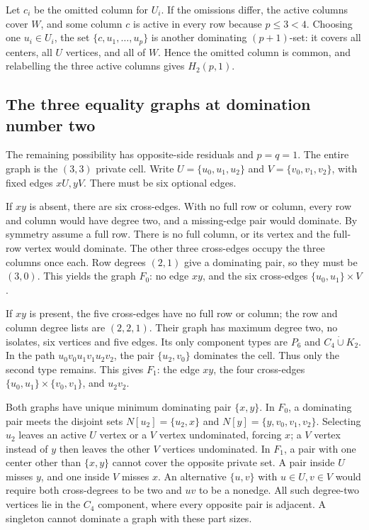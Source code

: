 \documentclass[11pt]{article}
\theoremstyle{definition}
\theoremstyle{remark}
\begin{document}
Let $c_i$ be the omitted column for $U_i$. If the omissions differ,
the active columns cover $W$, and some column $c$ is active in every
row because $p\le3<4$. Choosing one $u_i\in U_i$, the set
$\{c,u_1,\ldots,u_p\}$ is another dominating $(p+1)$-set: it covers all
centers, all $U$ vertices, and all of $W$. Hence the omitted column is
common, and relabelling the three active columns gives $H_2(p,1)$.

\subsection{The three equality graphs at domination number two}

The remaining possibility has opposite-side residuals and $p=q=1$.
The entire graph is the $(3,3)$ private cell. Write
$U=\{u_0,u_1,u_2\}$ and $V=\{v_0,v_1,v_2\}$, with fixed edges $xU,yV$.
There must be six optional edges.

If $xy$ is absent, there are six cross-edges. With no full row or column,
every row and column would have degree two, and a missing-edge pair
would dominate. By symmetry assume a full row. There is no full column,
or its vertex and the full-row vertex would dominate. The other three
cross-edges occupy the three columns once each. Row degrees $(2,1)$
give a dominating pair, so they must be $(3,0)$. This yields the graph
$F_0$: no edge $xy$, and the six cross-edges $\{u_0,u_1\}\times V$.

If $xy$ is present, the five cross-edges have no full row or column;
the row and column degree lists are $(2,2,1)$. Their graph has maximum
degree two, no isolates, six vertices and five edges. Its only component
types are $P_6$ and $C_4\mathbin{\dot\cup}K_2$. In the path
$u_0v_0u_1v_1u_2v_2$, the pair $\{u_2,v_0\}$ dominates the cell.
Thus only the second type remains. This gives $F_1$: the edge $xy$,
the four cross-edges $\{u_0,u_1\}\times\{v_0,v_1\}$, and $u_2v_2$.

Both graphs have unique minimum dominating pair $\{x,y\}$. In $F_0$,
a dominating pair meets the disjoint sets $N[u_2]=\{u_2,x\}$ and
$N[y]=\{y,v_0,v_1,v_2\}$. Selecting $u_2$ leaves an active $U$ vertex
or a $V$ vertex undominated, forcing $x$; a $V$ vertex instead of $y$
then leaves the other $V$ vertices undominated. In $F_1$, a pair with
one center other than $\{x,y\}$ cannot cover the opposite private set.
A pair inside $U$ misses $y$, and one inside $V$ misses $x$.
An alternative $\{u,v\}$ with $u\in U,v\in V$ would require both
cross-degrees to be two and $uv$ to be a nonedge. All such degree-two
vertices lie in the $C_4$ component, where every opposite pair is
adjacent. A singleton cannot dominate a graph with these part sizes.
\end{document}
